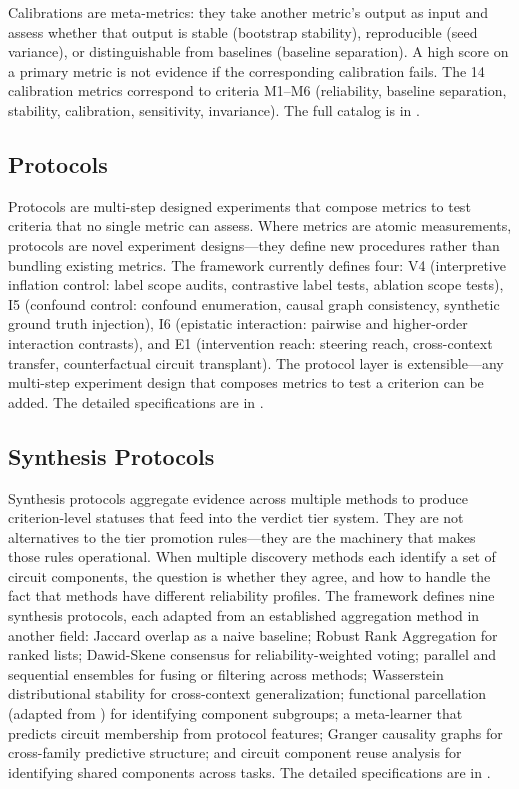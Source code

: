 \documentclass{article}
\begin{document}
Calibrations are meta-metrics: they take another metric's output as input and assess whether that output is stable (bootstrap stability), reproducible (seed variance), or distinguishable from baselines (baseline separation). A high score on a primary metric is not evidence if the corresponding calibration fails. The 14 calibration metrics correspond to criteria M1--M6 (reliability, baseline separation, stability, calibration, sensitivity, invariance). The full catalog is in .

\subsection{Protocols}
\label{sec:methodology-protocols}

Protocols are multi-step designed experiments that compose metrics to test criteria that no single metric can assess. Where metrics are atomic measurements, protocols are novel experiment designs---they define new procedures rather than bundling existing metrics. The framework currently defines four: V4 (interpretive inflation control: label scope audits, contrastive label tests, ablation scope tests), I5 (confound control: confound enumeration, causal graph consistency, synthetic ground truth injection), I6 (epistatic interaction: pairwise and higher-order interaction contrasts), and E1 (intervention reach: steering reach, cross-context transfer, counterfactual circuit transplant). The protocol layer is extensible---any multi-step experiment design that composes metrics to test a criterion can be added. The detailed specifications are in .

\subsection{Synthesis Protocols}
\label{sec:methodology-synthesis}

Synthesis protocols aggregate evidence across multiple methods to produce criterion-level statuses that feed into the verdict tier system. They are not alternatives to the tier promotion rules---they are the machinery that makes those rules operational. When multiple discovery methods each identify a set of circuit components, the question is whether they agree, and how to handle the fact that methods have different reliability profiles. The framework defines nine synthesis protocols, each adapted from an established aggregation method in another field: Jaccard overlap as a naive baseline; Robust Rank Aggregation \citep{kolde2012robust} for ranked lists; Dawid-Skene consensus \citep{dawid1979maximum} for reliability-weighted voting; parallel and sequential ensembles for fusing or filtering across methods; Wasserstein distributional stability for cross-context generalization; functional parcellation (adapted from \citealp{glasser2016multi}) for identifying component subgroups; a meta-learner that predicts circuit membership from protocol features; Granger causality graphs for cross-family predictive structure; and circuit component reuse analysis \citep{merullo2024circuit} for identifying shared components across tasks. The detailed specifications are in .
\end{document}
